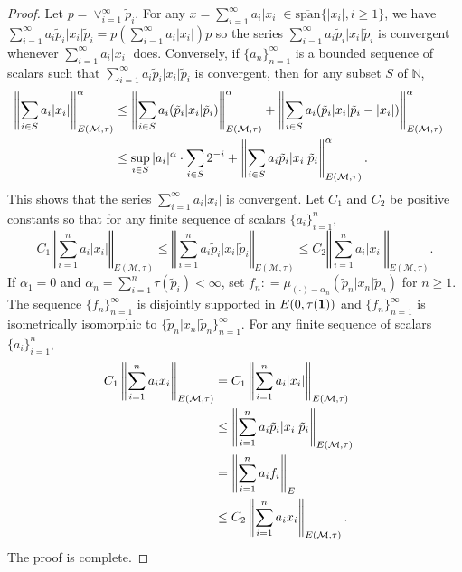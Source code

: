 \documentclass[12pt]{amsart}
\let\cal\mathcal
\def\m{{\cal M}}
\numberwithin{equation}{section}
\numberwithin{theorem}{section}
\begin{document}
\begin{proof}
Let $p= \vee_{i=1}^\infty \tilde{p}_i$. For any 
$x=\sum_{i=1}^\infty a_i\vert x_i\vert \in 
\overline{\text{span}}\{\vert x_i \vert, i\geq 1\}$, we have
$\sum_{i=1}^\infty a_i \tilde{p}_{i} \vert x_{i} \vert \tilde{p}_{i}=
p(\sum_{i=1}^\infty a_i\vert x_i\vert)p$ so the series 
$ \sum_{i=1}^\infty a_i \tilde{p}_{i} \vert x_{i} \vert \tilde{p}_{i}$
is convergent whenever $\sum_{i=1}^\infty a_i\vert x_i\vert$ does.
Conversely, if $\{a_n\}_{n=1}^\infty$ is a bounded sequence of
scalars such that 
$\sum_{i=1}^\infty a_i \tilde{p}_{i} \vert x_{i} \vert \tilde{p}_{i}$
is convergent, then for any subset $S$ of $\mathbb N$,
\begin{equation*}
\begin{split}
\left\Vert \sum_{i \in S} a_i \vert x_i \vert 
\right\Vert_{E(\m,\tau)}^\alpha 
&\leq \left\Vert \sum_{i \in S} a_i (\tilde{p}_i\vert x_i \vert 
\tilde{p}_i)\right\Vert_{E(\m,\tau)}^\alpha + 
\left\Vert \sum_{i \in S} a_i (\tilde{p}_i\vert x_i \vert 
\tilde{p}_i - \vert x_i \vert)\right\Vert_{E(\m,\tau)}^\alpha \cr
&\leq \sup_{i\in S}\vert a_i \vert^\alpha \cdot \sum_{i\in S} 2^{-i}
+ \left\Vert \sum_{i\in S} a_i \tilde{p}_{i} \vert x_{i} \vert 
\tilde{p}_{i} \right\Vert_{E(\m,\tau)}^\alpha.
\end{split}
\end{equation*}
This shows that the series $\sum_{i=1}^\infty a_i \vert x_i \vert$ is 
convergent.
Let $C_1$ and $C_2$ be positive constants so that  for any 
finite sequence of scalars
$\{a_i\}_{i=1}^n$,
$$C_1  \left\Vert\sum^{n}_{i=1} a_{i}\vert x_{i}\vert 
\right\Vert_{E(\m, \tau)} \leq
\left\Vert \sum^{n}_{i=1}a_{i} \tilde p_{i} \vert x_i \vert \tilde
p_{i} \right\Vert_{E(\m, \tau)} \leq
C_2 \left\Vert\sum^{n}_{i=1} a_{i}\vert x_{i}\vert \right\Vert_{E(\m, \tau)}.$$ 
If $\alpha_{1}=0$ and $\alpha_{n} = \sum \limits_{i=1}^{n} \tau(\tilde{p}_{i})
< \infty$,  set $f_{n}: = \mu_{(\cdot)- \alpha_{n}} (\tilde{p}_{n} \vert
x_{n} \vert \tilde{p}_{n})$ for $n \geq1$.  The sequence 
$\{f_{n}\}_{n=1}^\infty$
is disjointly supported in $E(0, \tau(\bf{1}))$ and 
$\{f_{n}\}_{n=1}^\infty$ is
isometrically isomorphic to $\{\tilde{p}_{n} \vert x_{n} \vert
\tilde{p}_{n}\}_{n=1}^\infty$. For any finite sequence of scalars $\{a_i\}_{i=1}^n$,
\begin{equation*}
\begin{split}
C_1\left\Vert \sum^{n}_{i=1} a_{i} x_{i} \right\Vert_{E(\m, \tau)} &= C_1
\left\Vert
\sum^{n}_{i=1} a_{i}\vert x_{i}\vert \right\Vert_{E(\m, \tau)} \cr
&\leq \left\Vert \sum^{n}_{i=1}a_{i} \tilde p_{i} \vert x_i \vert \tilde
p_{i} \right\Vert_{E(\m, \tau)} \cr
&= \left\Vert \sum^{n}_{i=1} a_{i} f_{i} \right\Vert_{E} \cr
&\leq C_2\left\Vert \sum^{n}_{i=1} a_{i} x_{i} \right\Vert_{E(\m, \tau)} .
\end{split}
\end{equation*}
The proof is complete.
\end{proof}
\end{document}

